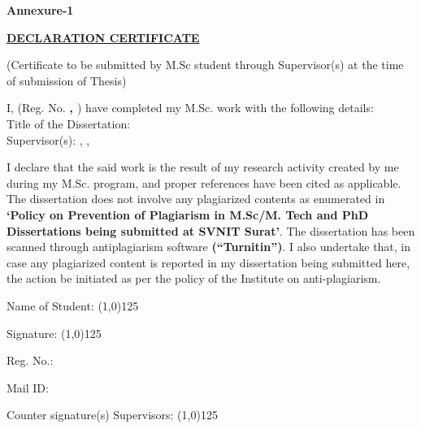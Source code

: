 \begin{flushright}
    \textbf{Annexure-1}
\end{flushright}

\vspace{15pt}

\begin{center}
    {\Large \textbf{\uline{{DECLARATION CERTIFICATE}}}}
\end{center}

\vspace{15pt}

\begin{spacing}{1.5}
(Certificate to be submitted by M.Sc student through Supervisor(s) at the time of submission of Thesis)

I, \textbf{\uline{\StudentName}} \hspace{2pt}(Reg. No. \textbf{\uline{\StudentAdminNo}, \uline{\StudentDept}}) have completed my M.Sc. work with the following details: \\ 
Title of the Dissertation: \textbf{\expandafter\uline\expandafter{\ProjectTitle}} \\
Supervisor(s): \SupervisorName, \SupervisorDept, \SupervisorUni

I declare that the said work is the result of my research activity created by me during my M.Sc. program, and proper references have been cited as applicable. The dissertation does not involve any plagiarized contents as enumerated in \textbf{‘Policy on Prevention of Plagiarism in M.Sc/M. Tech and PhD Dissertations being submitted at  SVNIT  Surat’}.  The dissertation has been scanned through antiplagiarism software \textbf{(“Turnitin”)}. I also undertake that, in case any plagiarized content is reported in my dissertation being submitted here, the action be initiated as per the policy of the Institute on anti-plagiarism.

\end{spacing}

\vspace{75pt}

\begin{multicols}{2}
    Name of Student: \line(1,0){125}
    
    \columnbreak

    \begin{center}
        Signature: \line(1,0){125}
    \end{center}

\end{multicols}

\begin{multicols}{2}
    Reg. No.: \StudentAdminNo    
    
    \columnbreak

    \begin{center}
        Mail ID: \StudentMail
    \end{center}

\end{multicols}

\vspace{75pt}

Counter signature(s) Supervisors: \line(1,0){125}